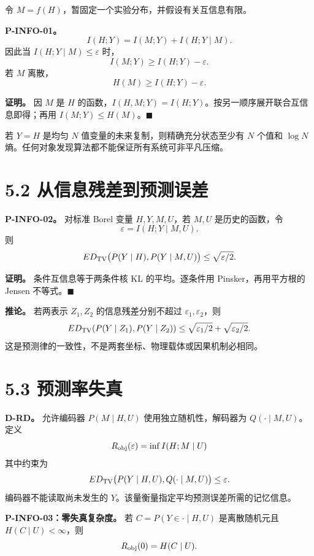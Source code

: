 \documentclass[
  11pt,
  oneside]{book}
\begin{document}
令 \(M=f(H)\)，暂固定一个实验分布，并假设有关互信息有限。

\hypertarget{p-info-01}{}\label{p-info-01}

\textbf{P-INFO-01。} \[I(H;Y)=I(M;Y)+I(H;Y\mid M).\] 因此当 \(I(H;Y\mid M)\le\varepsilon\) 时， \[I(M;Y)\ge I(H;Y)-\varepsilon.\] 若 \(M\) 离散， \[H(M)\ge I(H;Y)-\varepsilon.\]

\textbf{证明。} 因 \(M\) 是 \(H\) 的函数，\(I(H,M;Y)=I(H;Y)\)。按另一顺序展开联合互信息即得；再用 \(I(M;Y)\le H(M)\)。\(\blacksquare\)

若 \(Y=H\) 是均匀 \(N\) 值变量的未来复制，则精确充分状态至少有 \(N\) 个值和 \(\log N\) 熵。任何对象发现算法都不能保证所有系统可非平凡压缩。

\section{5.2 从信息残差到预测误差}\label{ux4eceux4fe1ux606fux6b8bux5deeux5230ux9884ux6d4bux8befux5dee}

\hypertarget{p-info-02}{}\label{p-info-02}

\textbf{P-INFO-02。} 对标准 Borel 变量 \(H,Y,M,U\)，若 \(M,U\) 是历史的函数，令 \[\varepsilon=I(H;Y\mid M,U).\] 则 \[E D_{\rm TV}\bigl(P(Y\mid H),P(Y\mid M,U)\bigr)
\le\sqrt{\varepsilon/2}.\]

\textbf{证明。} 条件互信息等于两条件核 KL 的平均。逐条件用 Pinsker，再用平方根的 Jensen 不等式。\(\blacksquare\)

\textbf{推论。} 若两表示 \(Z_1,Z_2\) 的信息残差分别不超过 \(\varepsilon_1,\varepsilon_2\)，则 \[E D_{\rm TV}(P(Y\mid Z_1),P(Y\mid Z_2))
\le\sqrt{\varepsilon_1/2}+\sqrt{\varepsilon_2/2}.\] 这是预测律的一致性，不是两套坐标、物理载体或因果机制必相同。

\section{5.3 预测率失真}\label{ux9884ux6d4bux7387ux5931ux771f}

\textbf{D-RD。} 允许编码器 \(P(M\mid H,U)\) 使用独立随机性，解码器为 \(Q(\cdot\mid M,U)\)。定义 \[R_{\rm obj}(\varepsilon)=
\inf I(H;M\mid U)\] 其中约束为 \[E D_{\rm TV}\bigl(P(Y\mid H,U),Q(\cdot\mid M,U)\bigr)
\le\varepsilon.\] 编码器不能读取尚未发生的 \(Y\)。该量衡量指定平均预测误差所需的记忆信息。

\hypertarget{p-info-03}{}\label{p-info-03}

\textbf{P-INFO-03：零失真复杂度。} 若 \(C=P(Y\in\cdot\mid H,U)\) 是离散随机元且 \(H(C\mid U)<\infty\)，则 \[R_{\rm obj}(0)=H(C\mid U).\]
\end{document}
